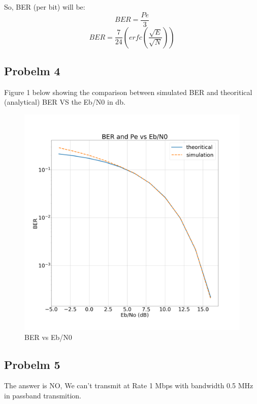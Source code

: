 \documentclass[a4paper,12pt]{report}
\begin{document}
        So, BER (per bit) will be:
        \begin{equation}
            BER = \frac{Pe}{3}
        \end{equation}
        \begin{equation}
            BER = \frac{7}{24} (erfc(\frac{\sqrt{E}}{\sqrt{N}}))
        \end{equation}

    
    \subsection{Probelm 4}
        Figure 1 below showing the comparison between simulated BER and theoritical (analytical) BER
        VS the Eb/N0 in db.
        \begin{figure}[h!]
            \includegraphics[width=\linewidth]{Figures/Figure_1.png}
            \caption{BER vs Eb/N0}
            \label{fig:BER}
        \end{figure}

    \subsection{Probelm 5}
        The answer is NO,
        We can't transmit at Rate 1 Mbps with bandwidth 0.5 MHz in passband transmition.
\end{document}
